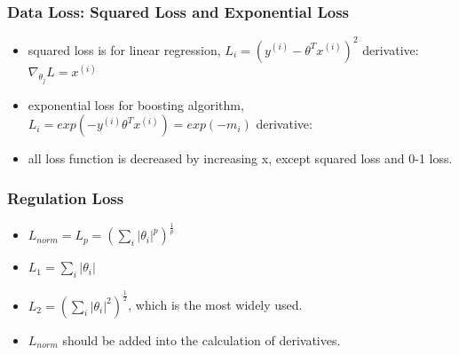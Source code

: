 \begin{frame}
\frametitle{Data Loss: Squared Loss and Exponential Loss}
	\small
	\begin{itemize}
		\item squared loss is for linear regression, $L_i=(y^{(i)}-\theta^Tx^{(i)})^2$
		\hspace{1cm} derivative:$\nabla_{\theta_j} L=x^{(i)}$
		\item exponential loss for boosting algorithm, $L_i=exp(-y^{(i)}\theta^Tx^{(i)})=exp(-m_i)$
		\hspace{1cm} derivative:
		\item all loss function is decreased by increasing x, except squared loss and 0-1 loss.
	\end{itemize}
\end{frame}
\begin{frame}
\frametitle{Regulation Loss}
	\small
	\begin{itemize}
	\item $L_{norm}=L_p=(\sum_i|\theta_i|^p)^{\frac{1}{p}}$
	\item $L_1=\sum_i|\theta_i|$
	\item $L_2=(\sum_i|\theta_i|^2)^{\frac{1}{2}}$, which is the most widely used.
	\item $L_{norm}$ should be added into the calculation of derivatives.
	\end{itemize}
\end{frame}
\ifx\allfiles\undefined

\fi

